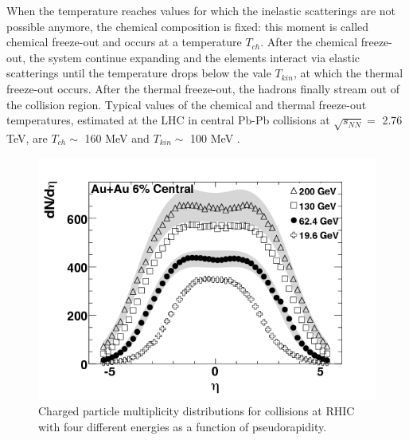 When the temperature reaches values for which the inelastic scatterings are not possible anymore, the chemical composition is fixed: this moment is called chemical freeze-out and occurs at a temperature $T_{ch}$. After the chemical freeze-out, the system continue expanding and the elements interact via elastic scatterings until the temperature drops below the vale $T_{kin}$, at which the thermal freeze-out occurs. After the thermal freeze-out, the hadrons finally stream out of the collision region. Typical values of the chemical and thermal freeze-out temperatures, estimated at the LHC in central Pb-Pb collisions at $\sqrt{s_{NN}} =$ 2.76 TeV, are $T_{ch}\sim$ 160 MeV and $T_{kin}\sim$ 100 MeV \cite{temp}.
%
\begin{figure}
  \centering
  \includegraphics[scale=0.5]{figures/dNdeta.png}
  \caption{Charged particle multiplicity distributions for collisions at RHIC with four different energies as a function of pseudorapidity\cite{dndeta}.}
  \label{fig:dndeta}
\end{figure}
%
%
